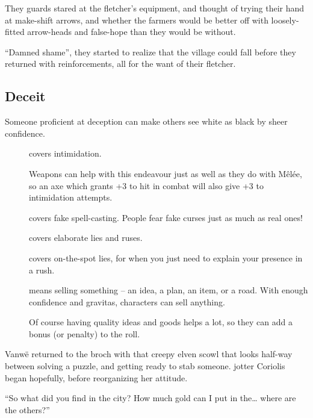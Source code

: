 \begin{multicols}{2}
\begin{exampletext}
  They \glspl{guard} stared at the fletcher's equipment, and thought of trying their hand at make-shift arrows, and whether the farmers would be better off with loosely-fitted arrow-heads and false-hope than they would be without.

  ``Damned shame'', they started to realize that the \gls{village} could fall before they returned with reinforcements, all for the want of their fletcher.
\end{exampletext}

\subsection{Deceit}

Someone proficient at deception can make others see white as black by sheer confidence.

\begin{description}
  \item[]
    covers intimidation.

    Weapons can help with this endeavour just as well as they do with M\^{e}l\'ee, so an axe which grants +3 to hit in combat will also give +3 to intimidation attempts.
  \item[]
    covers fake spell-casting.
    People fear fake curses just as much as real ones!
  \item[]
    covers elaborate lies and ruses.
  \item[]
    covers on-the-spot lies, for when you just need to explain your presence in a rush.
  \item[]
    means selling something -- an idea, a plan, an item, or a road.
    With enough confidence and gravitas, characters can sell anything.

    Of course having quality ideas and goods helps a lot, so they can add a bonus (or penalty) to the roll.
\end{description}


\begin{exampletext}
  Vanw\"e returned to the \gls{broch} with that creepy elven scowl that looks half-way between solving a puzzle, and getting ready to stab someone.
  \Gls{jotter} Coriolis began hopefully, before reorganizing her attitude.

  ``So what did you find in the city?
  How much gold can I put in the\ldots
  where are the others?''


\end{exampletext}
\end{multicols}
